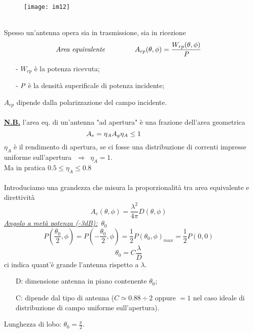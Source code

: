 \documentclass[a4paper]{article}
\begin{document}
\begin{figure}[ht] 
\centering
\texttt{[image: im12]}
\end{figure}
\\Spesso un'antenna opera sia in trasmissione, sia in ricezione
\begin{equation*}
\text{\emph{Area equivalente}}\hspace{15mm}A_{ep}(\theta,\phi)=\frac{W_{rp}(\theta,\phi)}{\emph{P}}
\end{equation*}
\begin{itemize}
\item[-] $W_{rp}$ è la potenza ricevuta;
\item[-] $\emph{P}$ è la densità superificale di potenza incidente;
\end{itemize}
$A_{ep}$ dipende dalla polarizzazione del campo incidente.\\\\
\underline{\textbf{N.B.}} l'area eq. di un'antenna "ad apertura" è una frazione dell'area geometrica
\begin{equation*}
A_e=\eta_AA_g\hspace{15mm\eta_A\leq1}
\end{equation*}
$\eta_A$ è il rendimento di apertura, se ci fosse una distribuzione di correnti impresse uniforme sull’apertura $\,\,\Rightarrow\,\,\,\eta_A=1$.\\
Ma in pratica $0.5\leq\eta_A\leq0.8$\\\\
Introduciamo una grandezza che misura la proporzionalità tra area equivalente e direttività
\begin{equation*}
A_{e}(\theta,\phi)=\frac{\lambda^2}{4\pi}D(\theta,\phi)
\end{equation*}
\underline{\emph{Angolo a metà potenza (-3dB):}} $\,\theta_0$
\begin{equation*}
P(\frac{\theta_0}{2},\phi)=P(-\frac{\theta_0}{2},\phi)=\frac{1}{2}P(\theta_0,\phi)_{max}=\frac{1}{2}P(0,0)
\end{equation*}
\begin{equation*}
\theta_0=C\frac{\lambda}{D}
\end{equation*}
\hspace*{4mm}ci indica quant'è grande l'antenna rispetto a $\lambda$.
\begin{itemize}
\item[D:] dimensione antenna in piano contenente $\theta_0$;
\item[C:] dipende dal tipo di antenna ($C\simeq0.88\div2$ oppure $=1$ nel caso ideale di distribuzione di campo uniforme sull’apertura).
\end{itemize}
Lunghezza di lobo: $\theta_0 = \frac{\pi}{2}$.
\end{document}
